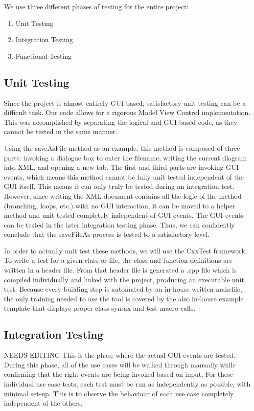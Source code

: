 \documentclass[twoside,letterpaper]{article}
\begin{document}
{\color{black}
We use three different phases of testing for the entire project:

\begin{enumerate}
\item Unit Testing
\item Integration Testing
\item Functional Testing
\end{enumerate}

\subsection{Unit Testing}
Since the project is almost entirely GUI based, satisfactory unit testing can be a difficult task. Our code allows for a rigorous Model View Control implementation. This was accomplished by separating the logical and GUI based code, as they cannot be tested in the same manner.

Using the saveAsFile method as an example, this method is composed of three parts: invoking a dialogue box to enter the filename, writing the current diagram into XML, and opening a new tab. The first and third parts are invoking GUI events, which means this method cannot be fully unit tested independent of the GUI itself. This means it can only truly be tested during an integration test. However, since writing the XML document contains all the logic of the method (branching, loops, etc.) with no GUI interaction, it can be moved to a helper method and unit tested completely independent of GUI events. The GUI events can be tested in the later integration testing phase. Thus, we can confidently conclude that the saveFileAs process is tested to a satisfactory level.

In order to actually unit test these methods, we will use the CxxTest framework. To write a test for a given class or file, the class and function definitions are written in a header file. From that header file is generated a .cpp file which is compiled individually and linked with the project, producing an executable unit test. Because every building step is automated by an in-house written makefile, the only training needed to use the tool is covered by the also in-house example template that displays proper class syntax and test macro calls.

\subsection{Integration Testing}
NEEDS EDITING
This is the phase where the actual GUI events are tested. During this phase, all of the use cases will be walked through manually while confirming that the right events are being invoked based on input. For these individual use case tests, each test must be run as independently as possible, with minimal set-up. This is to observe the behaviour of each use case completely independent of the others.

}
\end{document}
